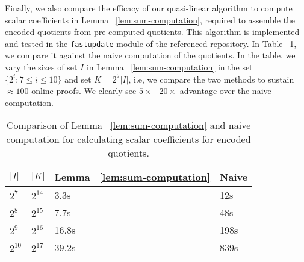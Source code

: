 Finally, we also compare the efficacy of our quasi-linear algorithm to compute scalar coefficients in
Lemma ~\ref{lem:sum-computation}, required to assemble the encoded quotients from pre-computed quotients.
This algorithm is implemented and tested in the {\tt fastupdate} module of the referenced repository.
In Table ~\ref{tbl:sum-computation-compare}, we compare it against the naive computation of the quotients.
In the table, we vary the sizes of set $I$ in Lemma ~\ref{lem:sum-computation} in the set $\{2^i:7\leq i\leq 10\}$
and set $K=2^7|I|$, i.e, we compare the two methods to sustain $\approx 100$ online proofs. We clearly see
$5\times-20\times$ advantage over the naive computation.

\begin{table}[htbp]
    \centering
    \begin{tabularx}{0.45\textwidth}{@{}XXXX@{}}
        \toprule
         $|I|$ & $|K|$ & Lemma ~\ref{lem:sum-computation} & Naive \\ \midrule
        $2^7$ & $2^{14}$ & 3.3s  & 12s \\
        $2^8$ & $2^{15}$ & 7.7s  & 48s \\
        $2^9$ & $2^{16}$ & 16.8s & 198s \\
        $2^{10}$ & $2^{17}$ & 39.2s & 839s \\
        \bottomrule
    \end{tabularx}
    \caption{Comparison of Lemma ~\ref{lem:sum-computation} and naive computation for calculating
    scalar coefficients for encoded quotients.}
    \label{tbl:sum-computation-compare}
\end{table}





